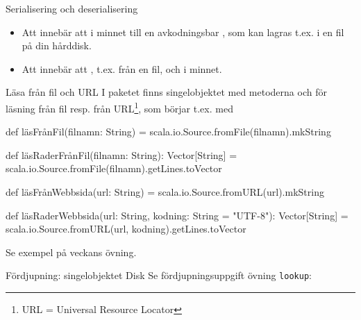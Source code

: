 


\begin{Slide}{Serialisering och deserialisering}
\begin{itemize}
  \item Att  innebär att  i minnet till en avkodningsbar , som kan lagras t.ex. i en fil på din hårddisk.
  \item Att  innebär att , t.ex. från en fil, och  i minnet.
\end{itemize}
\end{Slide}


\begin{Slide}{Läsa från fil och URL}
I paketet  finns singelobjektet  med metoderna  och  för läsning från fil resp. från  URL\footnote{URL = Universal Resource Locator}, som börjar t.ex. med 
\begin{Code}
def läsFrånFil(filnamn: String) = scala.io.Source.fromFile(filnamn).mkString

def läsRaderFrånFil(filnamn: String): Vector[String] =
  scala.io.Source.fromFile(filnamn).getLines.toVector

def läsFrånWebbsida(url: String) = scala.io.Source.fromURL(url).mkString

def läsRaderWebbsida(url: String, kodning: String = "UTF-8"): Vector[String] =
  scala.io.Source.fromURL(url, kodning).getLines.toVector

\end{Code}
Se exempel på veckans övning.
\end{Slide}


\begin{Slide}{Fördjupning: singelobjektet Disk}
Se fördjupningsuppgift övning \texttt{lookup}:
\end{Slide}

